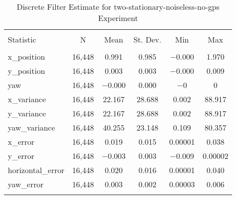 
\begin{table}[h] \centering 
  \caption{Discrete Filter Estimate for two-stationary-noiseless-no-gps Experiment} 
  \label{tab:two_stationary_noiseless_no_gps_discrete_summary} 
\begin{tabular}{@{\extracolsep{5pt}}lccccc} 
\\[-1.8ex]\hline 
\hline \\[-1.8ex] 
Statistic & \multicolumn{1}{c}{N} & \multicolumn{1}{c}{Mean} & \multicolumn{1}{c}{St. Dev.} & \multicolumn{1}{c}{Min} & \multicolumn{1}{c}{Max} \\ 
\hline \\[-1.8ex] 
x\_position & 16,448 & \num{0.991} & \num{0.985} & $-$0.000 & \num{1.970} \\ 
y\_position & 16,448 & \num{0.003} & \num{0.003} & $-$0.000 & \num{0.009} \\ 
yaw & 16,448 & $-$0.000 & \num{0.000} & $-$0 & 0 \\ 
x\_variance & 16,448 & \num{22.167} & \num{28.688} & \num{0.002} & \num{88.917} \\ 
y\_variance & 16,448 & \num{22.167} & \num{28.688} & \num{0.002} & \num{88.917} \\ 
yaw\_variance & 16,448 & \num{40.255} & \num{23.148} & \num{0.109} & \num{80.357} \\ 
x\_error & 16,448 & \num{0.019} & \num{0.015} & \num{0.00001} & \num{0.038} \\ 
y\_error & 16,448 & $-$0.003 & \num{0.003} & $-$0.009 & \num{0.00002} \\ 
horizontal\_error & 16,448 & \num{0.020} & \num{0.016} & \num{0.00001} & \num{0.040} \\ 
yaw\_error & 16,448 & \num{0.003} & \num{0.002} & \num{0.00003} & \num{0.006} \\ 
\hline \\[-1.8ex] 
\end{tabular} 
\end{table} 
